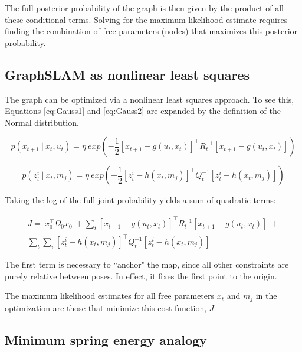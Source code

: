 The full posterior probability of the graph is then given by the product of all these conditional terms. Solving for the maximum likelihood estimate requires finding the combination of free parameters (nodes) that maximizes this posterior probability. 

\subsection{GraphSLAM as nonlinear least squares}

The graph can be optimized via a nonlinear least squares approach. To see this, Equations \ref{eq:Gauss1} and \ref{eq:Gauss2} are expanded by the definition of the Normal distribution.

\begin{equation}
p\left(x_{t+1}~|~x_t,u_t\right) = \eta~ exp\left(-\frac{1}{2}\left[x_{t+1} - g\left(u_t,x_t\right)\right]^{\intercal}R_t^{-1}\left[x_{t+1} - g\left(u_t,x_t\right)\right]\right)
\end{equation}

\begin{equation}
p\left(z^i_{t}~|~x_t,m_j\right) = \eta~ exp\left(-\frac{1}{2}\left[z^i_{t} - h\left(x_t,m_j\right)\right]^{\intercal}Q_t^{-1}\left[z^i_{t} - h\left(x_t,m_j\right)\right]\right)
\label{eq.measModel}
\end{equation}

Taking the log of the full joint probability yields a sum of quadratic terms:

\begin{multline}
J = ~x_0^{\intercal}\Omega_0 x_0 ~+
\sum_{t}{\left[x_{t+1} - g\left(u_t,x_t\right)\right]^{\intercal}R_t^{-1}\left[x_{t+1} - g\left(u_t,x_t\right)\right]} ~+ \\ \sum_{t}{\sum_{i}{\left[z^i_{t} - h\left(x_t,m_j\right)\right]^{\intercal}Q_t^{-1}\left[z^i_{t} - h\left(x_t,m_j\right)\right]}}
\label{eq.quadcost}
\end{multline}

The first term is necessary to ``anchor" the map, since all other constraints are purely relative between poses. In effect, it fixes the first point to the origin. 

The maximum likelihood estimates for all free parameters $x_t$ and $m_j$ in the optimization are those that minimize this cost function, $J$.

\subsection{Minimum spring energy analogy}

